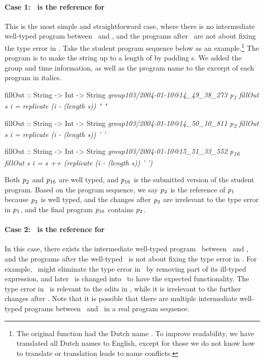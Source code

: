 \documentclass[12pt]{report}	%
\begin{document}
\paragraph{Case 1: \pgj\ is the reference for \pgi}
This is the most simple and straightforward case, 
where there is no intermediate well-typed program between 
\pgi\ and \pgj, and the programs after \pgj\ are not about 
fixing the type error in \pgi.
Take the student program sequence below as an example.\footnote{The original function had the Dutch name . To improve
readability, we have translated all Dutch names to English, except
for those we do not know how to translate or translation leads to name conflicts.}
The program is to make the string
 up to a length of  by
padding \progsq{\,}s.
We added the group and time information,
as well as the program name to the excerpt of each program in italics.
%
\begin{program}
fillOut :: String -> Int -> String \hfill \it{group103/2004-01-10@14_49_38_273 \quad p\textsubscript{1}}
fillOut s i = replicate (i - (length s)) " "

fillOut :: String -> Int -> String \hfill \it{group103/2004-01-10@14_50_10_811 \quad p\textsubscript{2}}
fillOut s i = replicate (i - (length s)) ' '

fillOut :: String -> Int -> String \hfill \it{group103/2004-01-10@15_51_33_552 \quad p\textsubscript{16}}
fillOut s i = s ++ (replicate (i - (length s)) ' ')
\end{program}
%
Both $\it{p\textsubscript{2}}$ and $\it{p\textsubscript{16}}$ are well typed, 
and $\it{p\textsubscript{16}}$ is the submitted version of the student program.
Based on the program sequence, we say
$\it{p\textsubscript{2}}$ is the reference of $\it{p\textsubscript{1}}$
because $\it{p\textsubscript{2}}$ is well typed,
and the changes after $\it{p\textsubscript{2}}$ are irrelevant to
the type error in $\it{p\textsubscript{1}}$,
and the final program $\it{p\textsubscript{16}}$ contains $\it{p\textsubscript{2}}$.

\paragraph{Case 2: \pgk\ is the reference for \pgi}
In this case, there exists the intermediate well-typed program \pgj\ 
between \pgi\ and \pgk, 
and the programs after the well-typed \pgk\ is not about fixing the type error in \pgi.
%
For example, \pgj\ might eliminate the type error
in \pgi\ by removing part of its ill-typed expression, and later
\pgj\ is changed into \pgk\ to have the expected functionality.
The type error in \pgi\ is relevant to the edits in \pgk,
while it is irrelevant to the further changes after \pgk.
Note that it is possible that there are multiple
intermediate well-typed programs
between \pgi\ and \pgk\ in a real program sequence.
\end{document}
